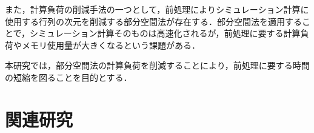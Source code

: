 \documentclass[a4j,12pt]{jreport}
\begin{document}
また，計算負荷の削減手法の一つとして，前処理によりシミュレーション計算に使用する行列の次元を削減する部分空間法が存在する．部分空間法を適用することで，シミュレーション計算そのものは高速化されるが，前処理に要する計算負荷やメモリ使用量が大きくなるという課題がある．

本研究では，部分空間法の計算負荷を削減することにより，前処理に要する時間の短縮を図ることを目的とする．
\chapter{関連研究} \label{chapter:2}
\end{document}
